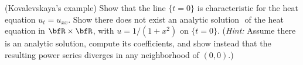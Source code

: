 \begin{problem}
  (Kovalevskaya's example) Show that the line \(\{t=0\}\) is characteristic
  for the heat equation \(u_t=u_{xx}\). Show there does not exist an
  analytic solution \(\) of the heat equation in \(\bfR\times\bfR\), with
  \(u=1/(1+x^2)\) on \(\{t=0\}\). (\emph{Hint:} Assume there is an analytic
  solution, compute its coefficients, and show instead that the resulting
  power series diverges in any neighborhood of \((0,0)\).)
\end{problem}
\begin{solution}
\end{solution}

